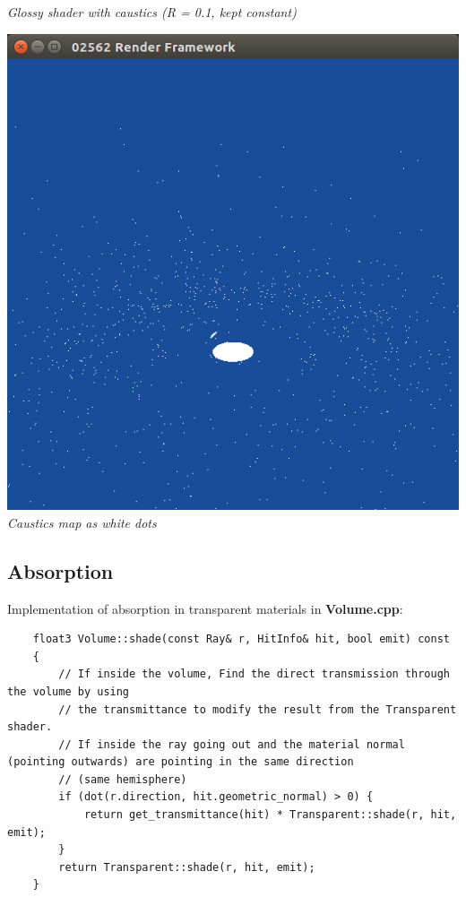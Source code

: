 \documentclass[a4,12pt]{article}
\begin{document}
\begin{center}
\begin{minipage}[b]{0.40\linewidth}
\begin{center}
				\textit{Glossy shader with caustics (R = 0.1, kept constant)}\\
			\end{center}
		\end{minipage}
	\end{center}
	
		\begin{center}
		\begin{minipage}[b]{0.40\linewidth}
			\begin{center}
				\includegraphics[width = \textwidth]{./Worksheet8/causticdots.png}\\
				\textit{Caustics map as white dots}\\
			\end{center}
		\end{minipage}
	\end{center}
	
	\subsection{Absorption}
	Implementation of absorption in transparent materials in \textbf{Volume.cpp}:
	
	\begin{lstlisting}
	float3 Volume::shade(const Ray& r, HitInfo& hit, bool emit) const
	{
		// If inside the volume, Find the direct transmission through the volume by using
		// the transmittance to modify the result from the Transparent shader.
		// If inside the ray going out and the material normal (pointing outwards) are pointing in the same direction
		// (same hemisphere)
		if (dot(r.direction, hit.geometric_normal) > 0) {
			return get_transmittance(hit) * Transparent::shade(r, hit, emit);
		}
		return Transparent::shade(r, hit, emit);
	}
	\end{lstlisting}
	
\end{document}
